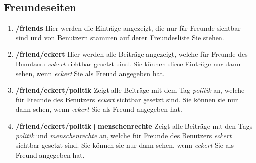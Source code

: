 \subsection{Freundeseiten} 
\label{subsec:freundeseiten}
\begin{enumerate}
    \item \textbf{/friends} \newline
    Hier werden die Einträge angezeigt, die nur für Freunde sichtbar sind und von Benutzern stammen auf deren Freundesliste Sie stehen.
    \item \textbf{/friend/eckert} \newline
    Hier werden alle Beiträge angezeigt, welche für Freunde des Benutzers \textit{eckert} sichtbar gesetzt sind. Sie können diese Einträge nur dann sehen, wenn \textit{eckert} Sie als Freund angegeben hat.
    \item \textbf{/friend/eckert/politik} \newline
    Zeigt alle Beiträge mit dem Tag \textit{politik} an, welche für Freunde des Benutzers \textit{eckert} sichtbar gesetzt sind. Sie können sie nur dann sehen, wenn \textit{eckert} Sie als Freund angegeben hat.
    \item \textbf{/friend/eckert/politik+menschenrechte} \newline
    Zeigt alle Beiträge mit den Tags \textit{politik} und \textit{menschenrechte} an, welche für Freunde des Benutzers \textit{eckert} sichtbar gesetzt sind. Sie können sie nur dann sehen, wenn \textit{eckert} Sie als Freund angegeben hat.
\end{enumerate}
